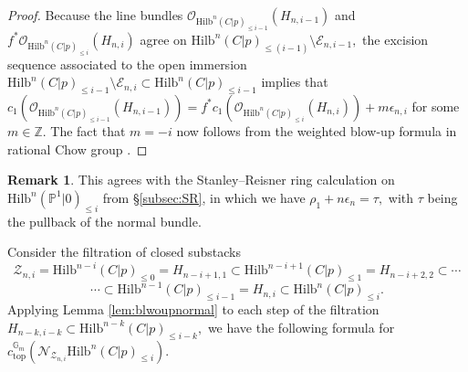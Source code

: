 \documentclass[10.5pt]{amsart}
\theoremstyle{definition}
\theoremstyle{definition}
\theoremstyle{definition}
\theoremstyle{definition}
\newtheorem{remark}[theorem]{Remark}
\newcommand{\Hilb}{\mathrm{Hilb}}
\newcommand{\cZ}{\mathcal{Z}}
\newcommand{\cE}{\mathcal{E}}
\newcommand{\cN}{\mathcal{N}}
\newcommand{\V}[1]{{\color{orange2} #1}}
\begin{document}
\begin{proof}
    
    Because the line bundles $\mathcal{O}_{\Hilb^n(C|p)_{\leq i-1}}(H_{n,i-1})$ and $f^* \mathcal{O}_{\Hilb^n(C|p)_{\leq i}}(H_{n,{i}})$ agree on $\Hilb^n(C|p)_{\leq (i-1)}\setminus \cE_{n, i-1},$ the excision sequence associated to the open immersion $\Hilb^n(C|p)_{\leq i-1}\setminus \cE_{n, i}\subset \Hilb^n(C|p)_{\leq i-1}$ implies that $c_1(\mathcal{O}_{\Hilb^n(C|p)_{\leq i-1}}(H_{n,i-1})) = f^* c_1(\mathcal{O}_{\Hilb^n(C|p)_{\leq i}}(H_{n,{i}}))+m\epsilon_{n,i}$ for some $m\in \mathbb{Z}.$ The fact that $m = -i$ now follows from the weighted blow-up formula in rational Chow group \cite{ArenaThesis}.
    
\end{proof}

\begin{remark}
  This agrees with the Stanley--Reisner ring calculation on $\Hilb^n(\mathbb{P}^1|0)_{\leq i}$ from §\ref{subsec:SR}, in which we have $\rho_1 + n \epsilon_n = \tau,$ with $\tau$ being the pullback of the normal bundle.
\end{remark}


Consider the filtration of closed substacks $$\mathcal{Z}_{n,i} =\Hilb^{n-i}(C|p)_{\le 0}  = H_{n-i+1, 1}\subset \Hilb^{n-i+1}(C|p)_{\le{1}}=H_{n-i+2, 2} \subset \cdots$$ $$\cdots \subset  \Hilb^{n-1}(C|p)_{\le i-1}= H_{n,i}\subset \Hilb^n(C|p)_{\leq i}.$$ Applying Lemma \ref{lem:blwoupnormal} to each step of the filtration $H_{n-k, i-k}\subset \Hilb^{n-k}(C|p)_{\leq i-k},$ we have the following formula for $c_{\mathrm{top}}^{\mathbb{G}_m} (\cN_{\cZ_{n,i}}\Hilb^n(C|p)_{\leq i}).$
\end{document}
